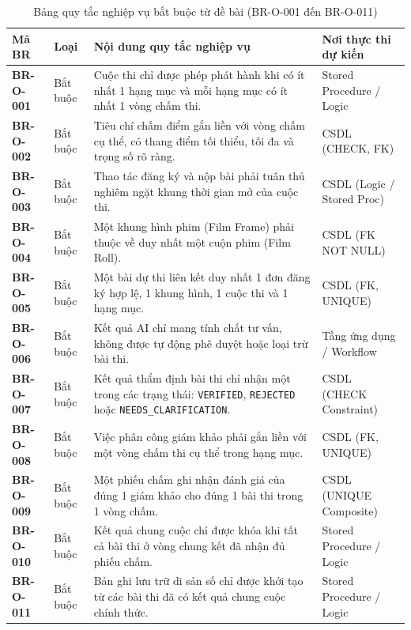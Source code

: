 \begin{table}[!ht]
\centering
\caption{Bảng quy tắc nghiệp vụ bắt buộc từ đề bài (BR-O-001 đến BR-O-011)}
\label{tab:c2_br}
\label{tab:c2_br_mandatory}
\scriptsize
\begin{tabularx}{\textwidth}{p{2.0cm}p{1.6cm}>{\raggedright\arraybackslash}Xp{3.8cm}}
\toprule
\textbf{Mã BR} & \textbf{Loại} & \textbf{Nội dung quy tắc nghiệp vụ} & \textbf{Nơi thực thi dự kiến} \\
\midrule
\textbf{BR-O-001} & Bắt buộc & Cuộc thi chỉ được phép phát hành khi có ít nhất 1 hạng mục và mỗi hạng mục có ít nhất 1 vòng chấm thi. & Stored Procedure / Logic \\
\textbf{BR-O-002} & Bắt buộc & Tiêu chí chấm điểm gắn liền với vòng chấm cụ thể, có thang điểm tối thiểu, tối đa và trọng số rõ ràng. & CSDL (CHECK, FK) \\
\textbf{BR-O-003} & Bắt buộc & Thao tác đăng ký và nộp bài phải tuân thủ nghiêm ngặt khung thời gian mở của cuộc thi. & CSDL (Logic / Stored Proc) \\
\textbf{BR-O-004} & Bắt buộc & Một khung hình phim (Film Frame) phải thuộc về duy nhất một cuộn phim (Film Roll). & CSDL (FK NOT NULL) \\
\textbf{BR-O-005} & Bắt buộc & Một bài dự thi liên kết duy nhất 1 đơn đăng ký hợp lệ, 1 khung hình, 1 cuộc thi và 1 hạng mục. & CSDL (FK, UNIQUE) \\
\textbf{BR-O-006} & Bắt buộc & Kết quả AI chỉ mang tính chất tư vấn, không được tự động phê duyệt hoặc loại trừ bài thi. & Tầng ứng dụng / Workflow \\
\textbf{BR-O-007} & Bắt buộc & Kết quả thẩm định bài thi chỉ nhận một trong các trạng thái: \texttt{VERIFIED}, \texttt{REJECTED} hoặc \texttt{NEEDS\_CLARIFICATION}. & CSDL (CHECK Constraint) \\
\textbf{BR-O-008} & Bắt buộc & Việc phân công giám khảo phải gắn liền với một vòng chấm thi cụ thể trong hạng mục. & CSDL (FK, UNIQUE) \\
\textbf{BR-O-009} & Bắt buộc & Một phiếu chấm ghi nhận đánh giá của đúng 1 giám khảo cho đúng 1 bài thi trong 1 vòng chấm. & CSDL (UNIQUE Composite) \\
\textbf{BR-O-010} & Bắt buộc & Kết quả chung cuộc chỉ được khóa khi tất cả bài thi ở vòng chung kết đã nhận đủ phiếu chấm. & Stored Procedure / Logic \\
\textbf{BR-O-011} & Bắt buộc & Bản ghi lưu trữ di sản số chỉ được khởi tạo từ các bài thi đã có kết quả chung cuộc chính thức. & Stored Procedure / Logic \\
\bottomrule
\end{tabularx}
\end{table}

